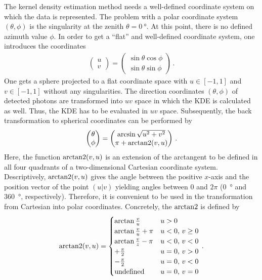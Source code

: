 The kernel density estimation method needs a well-defined coordinate system on which the data is represented. The problem with a polar coordinate system $(\theta,\phi)$ is the singularity at the zenith $\theta=\SI{0}{\degree}$. At this point, there is no defined azimuth value $\phi$. In order to get a \enquote{flat} and well-defined coordinate system, one introduces the coordinates
\begin{align}
	\begin{pmatrix}u\\v\end{pmatrix} = \begin{pmatrix}\sin\theta\cos\phi\\\sin\theta\sin\phi\end{pmatrix}\,.
\end{align}
One gets a sphere projected to a flat coordinate space with $u\in[-1,1]$ and $v\in[-1,1]$ without any singularities. The direction coordinates $(\theta,\phi)$ of detected photons are transformed into $uv$ space in which the KDE is calculated as well. Thus, the KDE has to be evaluated in $uv$ space. Subsequently, the back transformation to spherical coordinates can be performed by
\begin{align}
	\begin{pmatrix}
		\theta\\
		\phi
	\end{pmatrix}
	= 
	\begin{pmatrix}
		\arcsin\sqrt{u^2+v^2}\\
		\pi+\operatorname{arctan2}(v,u)
		\end{pmatrix}\,.
\end{align} 
Here, the function $\operatorname{arctan2}(v,u)$ is an extension of the arctangent to be defined in all four quadrants of a two-dimensional Cartesian coordinate system. Descriptively, $\operatorname{arctan2}(v,u)$ gives the angle between the positive $x$-axis and the position vector of the point $(u|v)$ yielding angles between $0$ and $2\pi$ (\SI{0}{\degree} and \SI{360}{\degree}, respectively). Therefore, it is convenient to be used in the transformation from Cartesian into polar coordinates. Concretely, the $\operatorname{arctan2}$ is defined by
\begin{align}
	\operatorname{arctan2}(v,u)=
	\begin{cases}
		\arctan\frac{v}{u} & u > 0\\
		\arctan\frac{v}{u} + \pi & u < 0,\,v \geq 0\\
		\arctan\frac{v}{z} - \pi & u < 0,\,v < 0 \\
		+\frac{\pi}{2} & u = 0,\,v > 0\\
		-\frac{\pi}{2} & u = 0,\,v < 0\\
		\text{undefined} & u = 0,\,v = 0
	\end{cases}\,.
\end{align}

